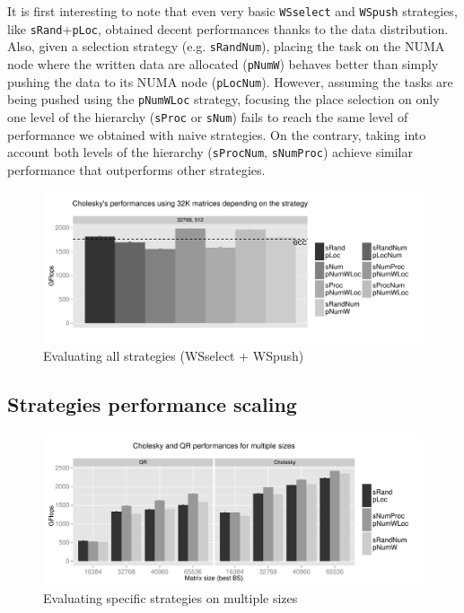 \documentclass{Styles/llncs}
\begin{document}
It is first interesting to note that even very basic \verb/WSselect/
and \verb/WSpush/ strategies, like \verb/sRand/+\verb/pLoc/, obtained decent performances
thanks to the data distribution.
Also, given a selection strategy (e.g. \verb/sRandNum/), placing
the task on the NUMA node where the written data are allocated (\verb/pNumW/) behaves better than simply pushing the data to its NUMA node (\verb/pLocNum/).
However, assuming the tasks are being pushed using the \verb/pNumWLoc/ strategy, focusing the
place selection on only one level of the hierarchy (\verb/sProc/ or \verb/sNum/)
fails to reach the same level of performance we obtained with naive strategies.
On the contrary, taking into account both levels of the hierarchy (\verb/sProcNum/,
\verb/sNumProc/) achieve similar performance that outperforms other strategies.

\begin{figure}[t]
  \centering
  \includegraphics[scale=0.5]{figures/graph_all_strat.pdf}
  \caption{Evaluating all strategies (WSselect + WSpush)}
\label{fig:eval-all-strat}
\end{figure}

\subsection{Strategies performance scaling}

\begin{figure}[t]
  \centering
  \includegraphics[scale=0.5]{figures/graph_details_strat.pdf}
\caption{Evaluating specific strategies on multiple sizes}
\label{fig:eval-strat-sizes}
\end{figure}
\end{document}
